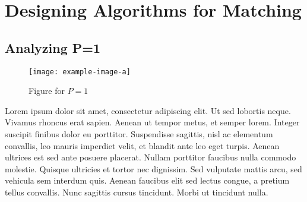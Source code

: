 \section{Designing Algorithms for Matching}
 \subsection{Analyzing P=1}
 \begin{figure*}
     \centering 
     \texttt{[image: example-image-a]}
     \caption{Figure for $P=1$}
 \end{figure*}

 Lorem ipsum dolor sit amet, consectetur adipiscing elit. Ut sed lobortis neque. Vivamus rhoncus erat sapien. Aenean ut tempor metus, et semper lorem. Integer suscipit finibus dolor eu porttitor. Suspendisse sagittis, nisl ac elementum convallis, leo mauris imperdiet velit, et blandit ante leo eget turpis. Aenean ultrices est sed ante posuere placerat. Nullam porttitor faucibus nulla commodo molestie. Quisque ultricies et tortor nec dignissim. Sed vulputate mattis arcu, sed vehicula sem interdum quis. Aenean faucibus elit sed lectus congue, a pretium tellus convallis. Nunc sagittis cursus tincidunt. Morbi ut tincidunt nulla.

